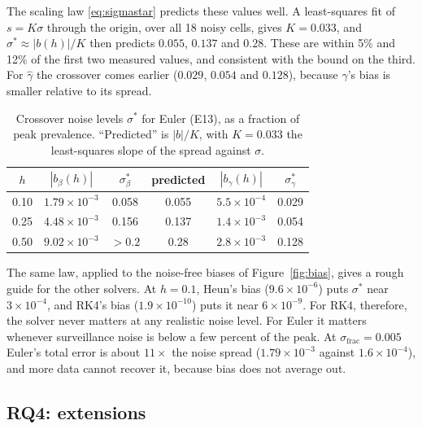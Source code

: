 \documentclass[sigconf]{acmart}
\begin{document}
The scaling law \eqref{eq:sigmastar} predicts these values well. A
least-squares fit of $s=K\sigma$ through the origin, over all 18 noisy
cells, gives $K=0.033$, and $\sigma^*\approx|b(h)|/K$ then predicts
$0.055$, $0.137$ and $0.28$. These are within 5\% and 12\% of the first
two measured values, and consistent with the bound on the third. For
$\hat\gamma$ the crossover comes earlier ($0.029$, $0.054$ and $0.128$),
because $\gamma$'s bias is smaller relative to its spread.

\begin{table}[t]
  \centering
  \footnotesize
  \caption{Crossover noise levels $\sigma^*$ for Euler (E13), as a
    fraction of peak prevalence. ``Predicted'' is $|b|/K$, with $K=0.033$
    the least-squares slope of the spread against $\sigma$.}
  \label{tab:cross}
  \begin{tabular}{@{}cccccc@{}}
    \toprule
    $h$ & $|b_\beta(h)|$ & $\sigma^*_\beta$ & predicted & $|b_\gamma(h)|$ & $\sigma^*_\gamma$\\
    \midrule
    0.10 & $1.79\times10^{-3}$ & 0.058 & 0.055 & $5.5\times10^{-4}$ & 0.029\\
    0.25 & $4.48\times10^{-3}$ & 0.156 & 0.137 & $1.4\times10^{-3}$ & 0.054\\
    0.50 & $9.02\times10^{-3}$ & $>0.2$ & 0.28 & $2.8\times10^{-3}$ & 0.128\\
    \bottomrule
  \end{tabular}
\end{table}

The same law, applied to the noise-free biases of Figure~\ref{fig:bias},
gives a rough guide for the other solvers. At $h=0.1$, Heun's bias
($9.6\times10^{-6}$) puts $\sigma^*$ near $3\times10^{-4}$, and RK4's
bias ($1.9\times10^{-10}$) puts it near $6\times10^{-9}$. For RK4,
therefore, the solver never matters at any realistic noise level. For
Euler it matters whenever surveillance noise is below a few percent of
the peak. At $\sigma_{\mathrm{frac}}=0.005$ Euler's total error is about
$11\times$ the noise spread
($1.79\times10^{-3}$ against $1.6\times10^{-4}$), and more data cannot
recover it, because bias does not average out.

\subsection{RQ4: extensions}
\label{sec:res-rq4}
\end{document}
